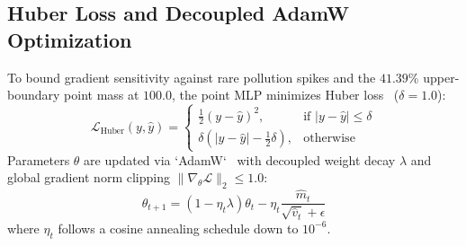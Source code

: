 \documentclass[journal,10pt,twocolumn]{IEEEtran}
\begin{document}
\subsection{Huber Loss and Decoupled AdamW Optimization}
To bound gradient sensitivity against rare pollution spikes and the $41.39\%$ upper-boundary point mass at $100.0$, the point MLP minimizes Huber loss~\cite{huber1964robust} ($\delta = 1.0$):
\begin{equation}
    \mathcal{L}_{\text{Huber}}(y, \hat{y}) = \begin{cases} \frac{1}{2}(y - \hat{y})^2, & \text{if } |y - \hat{y}| \le \delta \\ \delta\left(|y - \hat{y}| - \frac{1}{2}\delta\right), & \text{otherwise} \end{cases}
\end{equation}
Parameters $\theta$ are updated via `AdamW`~\cite{loshchilov2019decoupled} with decoupled weight decay $\lambda$ and global gradient norm clipping $\|\nabla_\theta \mathcal{L}\|_2 \le 1.0$:
\begin{equation}
    \theta_{t+1} = (1 - \eta_t \lambda)\theta_t - \eta_t \frac{\hat{m}_t}{\sqrt{\hat{v}_t} + \epsilon}
\end{equation}
where $\eta_t$ follows a cosine annealing schedule down to $10^{-6}$.
\end{document}
